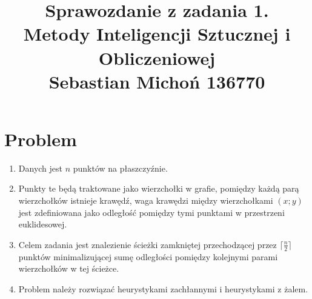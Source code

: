 \documentclass[12pt]{article}
\begin{document}
	\title{Sprawozdanie z zadania 1.\\
		\large Metody Inteligencji Sztucznej i Obliczeniowej\\
		\large Sebastian Michoń 136770}
	\date{\vspace{-10ex}}
	\maketitle
	\section{Problem}
	\begin{enumerate}
		\item Danych jest \(n\) punktów na płaszczyźnie.
		\item Punkty te będą traktowane jako wierzchołki w grafie, pomiędzy każdą parą wierzchołków istnieje krawędź, waga krawędzi między wierzchołkami \((x;y)\) jest zdefiniowana jako odległość pomiędzy tymi punktami w przestrzeni euklidesowej.
		\item Celem zadania jest znalezienie ścieżki zamkniętej przechodzącej przez \(\lceil \frac{n}{2} \rceil\) punktów minimalizującej sumę odległości pomiędzy kolejnymi parami wierzchołków w tej ścieżce.
		\item Problem należy rozwiązać heurystykami zachłannymi i heurystykami z żalem.
	\end{enumerate}
	
\end{document}
